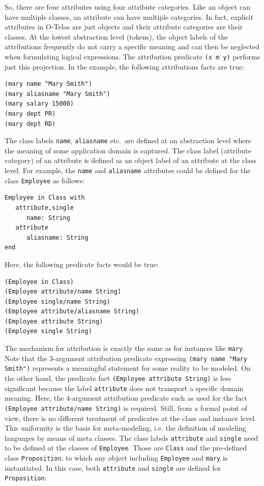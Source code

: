So, there are four attributes using four attribute categories. Like an object can have multiple classes,
an attribute can have multiple categories. In fact, explicit attributes in O-Telos are just
objects and their attribute categories are their classes. 
At the lowest abstraction level (tokens), 
the object labels of the attributions frequently do not carry a specific meaning and
can then be neglected when formulating logical expressions. 
The attribution predicate {\tt (x m y)} performs just this projection.
In the example, the following attributions facts are true:

\begin{verbatim}
(mary name "Mary Smith")
(mary aliasname "Mary Smith")
(mary salary 15000)
(mary dept PR)
(mary dept RD)
\end{verbatim}

The class labels {\tt name}, {\tt aliasname} etc.\ are defined at an abstraction level where
the meaning of some application domain is captured. 
The class label (attribute category) of an attribute is
defined as an object label of an attribute at the class level. For example, the {\tt name}
and {\tt aliasname} attributes could be defined for the class {\tt Employee} as follows:

\begin{verbatim}
Employee in Class with
   attribute,single
      name: String
   attribute
      aliasname: String
end
\end{verbatim}

Here, the following predicate facts would be true:

\begin{verbatim}
(Employee in Class)
(Employee attribute/name String)
(Employee single/name String)
(Employee attribute/aliasname String)
(Employee attribute String)
(Employee single String)
\end{verbatim}

The mechanism for attribution is exactly the same as for instances like {\tt mary}. 
Note that the 3-argument attribution predicate expressing {\tt (mary name "Mary Smith")} 
represents a meaningful statement for some reality to be modeled. 
On the other hand, the predicate fact {\tt (Employee attribute String)} is less significant
because the label {\tt attribute} does not transport a specific domain meaning. Here, the 4-argument
attribution predicate such as used for the fact {\tt (Employee attribute/name String)}
is required. Still, from a formal point of view, there is no different treatment of
predicates at the class and instance level.
This uniformity is the basis for meta-modeling, i.e. the definition of modeling
languages by means of meta classes.
The class labels
{\tt attribute} and {\tt single} need to be defined at the classes of {\tt Employee}. Those are
{\tt Class} and the pre-defined class {\tt Proposition}, to which any object including {\tt Employee}
and {\tt mary} is instantiated. In this case, both {\tt attribute} and {\tt single} are defined 
for {\tt Proposition}:

